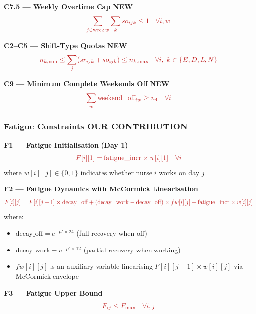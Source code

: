 \documentclass[12pt,a4paper]{article}
\newcommand{\newbadge}{\colorbox{accentgreen}{\tiny\color{white}\textbf{NEW}}\,}
\newcommand{\contribbadge}{\colorbox{accentred}{\tiny\color{white}\textbf{OUR CONTRIBUTION}}\,}
\begin{document}
\vspace{6pt}
\begin{eqbox}
\textbf{C7.5 — Weekly Overtime Cap} \newbadge
\begin{equation}
  \textcolor{accentred}{\sum_{j \in \text{week}\,w}\sum_k so_{ijk} \leq 1 \quad \forall i,w}
\end{equation}
\end{eqbox}

\vspace{6pt}
\begin{eqbox}
\textbf{C2–C5 — Shift-Type Quotas} \newbadge
\begin{equation}
  \textcolor{accentred}{
    n_{k,\min} \leq \sum_j(sr_{ijk}+so_{ijk}) \leq n_{k,\max}
    \quad \forall i,\; k \in \{E,D,L,N\}
  }
\end{equation}
\end{eqbox}

\vspace{6pt}
\begin{eqbox}
\textbf{C9 — Minimum Complete Weekends Off} \newbadge
\begin{equation}
  \textcolor{accentred}{\sum_w \text{weekend\_off}_{iw} \geq n_4 \quad \forall i}
\end{equation}
\end{eqbox}

\subsubsection{Fatigue Constraints \contribbadge}

\begin{eqbox}
\textbf{F1 — Fatigue Initialisation (Day 1)}
\begin{equation}
  \textcolor{accentred}{
    F[i][1] = \text{fatigue\_incr} \times w[i][1] \quad \forall i
  }
\end{equation}
where $w[i][j] \in \{0,1\}$ indicates whether nurse $i$ works on day $j$.

\textbf{F2 — Fatigue Dynamics with McCormick Linearisation}
\begin{equation}
  \textcolor{accentred}{
    F[i][j] = F[i][j-1] \times \text{decay\_off} + (\text{decay\_work} - \text{decay\_off}) \times fw[i][j] + \text{fatigue\_incr} \times w[i][j]
  }
\end{equation}
where:
\begin{itemize}[itemsep=1pt]
  \item decay$\_\text{off} = e^{-\mu' \times 24}$ (full recovery when off)
  \item decay$\_\text{work} = e^{-\mu' \times 12}$ (partial recovery when working)
  \item $fw[i][j]$ is an auxiliary variable linearising $F[i][j-1] \times w[i][j]$ via McCormick envelope
\end{itemize}

\textbf{F3 — Fatigue Upper Bound}
\begin{equation}
  \textcolor{accentred}{F_{ij} \leq F_{\max} \quad \forall i,j}
\end{equation}
\end{eqbox}
\end{document}
